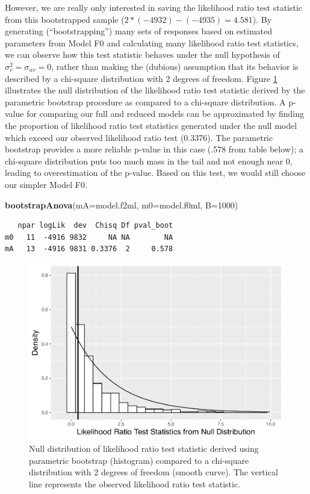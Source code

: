 \documentclass[
]{krantz}
\newenvironment{Shaded}{\begin{snugshade}}{\end{snugshade}}
\newcommand{\AttributeTok}[1]{\textcolor[rgb]{0.27,0.27,0.27}{#1}}
\newcommand{\DecValTok}[1]{\textcolor[rgb]{0.06,0.06,0.06}{#1}}
\newcommand{\FunctionTok}[1]{\textcolor[rgb]{0.27,0.27,0.27}{\textbf{#1}}}
\newcommand{\NormalTok}[1]{#1}
\begin{document}
However, we are really only interested in saving the likelihood ratio test statistic from this bootstrapped sample (\(2*(-4932) - (-4935) = 4.581\)). By generating (``bootstrapping'') many sets of responses based on estimated parameters from Model F0 and calculating many likelihood ratio test statistics, we can observe how this test statistic behaves under the null hypothesis of \(\sigma_{v}^{2} = \sigma_{uv} = 0\), rather than making the (dubious) assumption that its behavior is described by a chi-square distribution with 2 degrees of freedom. Figure \ref{fig:paraboot9} illustrates the null distribution of the likelihood ratio test statistic derived by the parametric bootstrap procedure as compared to a chi-square distribution. A p-value for comparing our full and reduced models can be approximated by finding the proportion of likelihood ratio test statistics generated under the null model which exceed our observed likelihood ratio test (0.3376). The parametric bootstrap provides a more reliable p-value in this case (.578 from table below); a chi-square distribution puts too much mass in the tail and not enough near 0, leading to overestimation of the p-value. Based on this test, we would still choose our simpler Model F0.

\begin{Shaded}
\begin{Highlighting}[]
\FunctionTok{bootstrapAnova}\NormalTok{(}\AttributeTok{mA=}\NormalTok{model.f2ml, }\AttributeTok{m0=}\NormalTok{model.f0ml, }\AttributeTok{B=}\DecValTok{1000}\NormalTok{)}
\end{Highlighting}
\end{Shaded}

\begin{verbatim}
   npar logLik  dev  Chisq Df pval_boot
m0   11  -4916 9832     NA NA        NA
mA   13  -4916 9831 0.3376  2     0.578
\end{verbatim}

\begin{figure}

{\centering \includegraphics[width=0.6\linewidth]{bookdown-BeyondMLR_files/figure-latex/paraboot9-1} 

}

\caption{Null distribution of likelihood ratio test statistic derived using parametric bootstrap (histogram) compared to a chi-square distribution with 2 degrees of freedom (smooth curve).  The vertical line represents the observed likelihood ratio test statistic.}\label{fig:paraboot9}
\end{figure}
\end{document}
